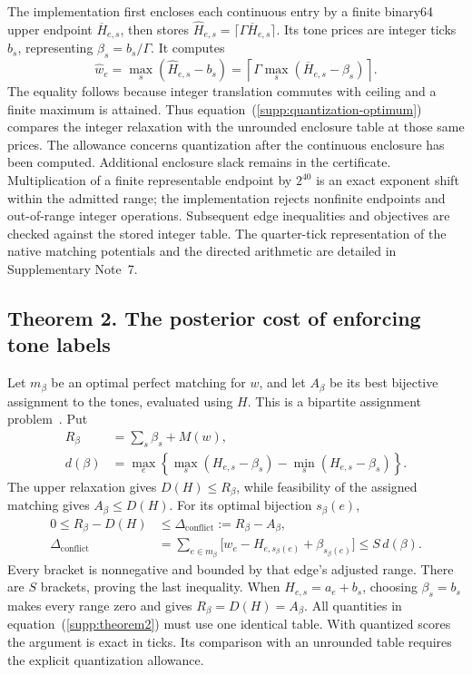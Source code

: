 \documentclass[10pt,letterpaper]{article}
\begin{document}
The implementation first encloses each continuous entry by a finite binary64 upper endpoint $\overline H_{e,s}$, then stores $\widehat H_{e,s}=\lceil\Gamma\overline H_{e,s}\rceil$. Its tone prices are integer ticks $b_s$, representing $\beta_s=b_s/\Gamma$. It computes
\begin{equation}
 \widehat w_e=\max_s(\widehat H_{e,s}-b_s)
 =\left\lceil\Gamma\max_s(\overline H_{e,s}-\beta_s)\right\rceil.
 \label{supp:table-quantization}
\end{equation}
The equality follows because integer translation commutes with ceiling and a finite maximum is attained. Thus equation~(\ref{supp:quantization-optimum}) compares the integer relaxation with the unrounded enclosure table at those same prices. The allowance concerns quantization after the continuous enclosure has been computed. Additional enclosure slack remains in the certificate. Multiplication of a finite representable endpoint by $2^{40}$ is an exact exponent shift within the admitted range; the implementation rejects nonfinite endpoints and out-of-range integer operations. Subsequent edge inequalities and objectives are checked against the stored integer table. The quarter-tick representation of the native matching potentials and the directed arithmetic are detailed in Supplementary Note~7.

\subsection{Theorem 2. The posterior cost of enforcing tone labels}
Let $m_\beta$ be an optimal perfect matching for $w$, and let $A_\beta$ be its best bijective assignment to the tones, evaluated using $H$. This is a bipartite assignment problem~\cite{kuhn}. Put
\begin{equation}
 \begin{aligned}
 R_\beta&=\sum_s\beta_s+M(w),\\
 d(\beta)&=\max_e\left\{\max_s(H_{e,s}-\beta_s)
                         -\min_s(H_{e,s}-\beta_s)\right\}.
 \end{aligned}
 \label{supp:conflict-definitions}
\end{equation}
The upper relaxation gives $D(H)\le R_\beta$, while feasibility of the assigned matching gives $A_\beta\le D(H)$. For its optimal bijection $s_\beta(e)$,
\begin{equation}
 \begin{aligned}
 0\le R_\beta-D(H)&\le\Delta_{\mathrm{conflict}}:=R_\beta-A_\beta,\\
 \Delta_{\mathrm{conflict}}
 &=\sum_{e\in m_\beta}\bigl[w_e-H_{e,s_\beta(e)}+\beta_{s_\beta(e)}\bigr]
 \le S\,d(\beta).
 \end{aligned}
 \label{supp:theorem2}
\end{equation}
Every bracket is nonnegative and bounded by that edge's adjusted range. There are $S$ brackets, proving the last inequality. When $H_{e,s}=a_e+b_s$, choosing $\beta_s=b_s$ makes every range zero and gives $R_\beta=D(H)=A_\beta$. All quantities in equation~(\ref{supp:theorem2}) must use one identical table. With quantized scores the argument is exact in ticks. Its comparison with an unrounded table requires the explicit quantization allowance.
\end{document}
